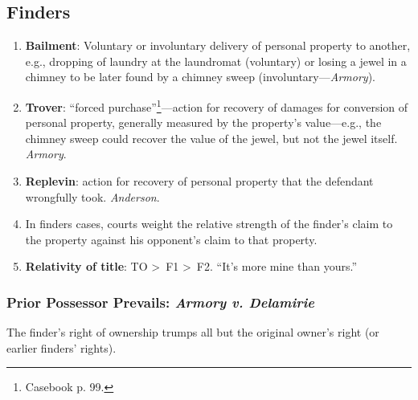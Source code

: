 \subsection{Finders}

\begin{enumerate}
    \item \textbf{Bailment}: Voluntary or involuntary delivery of personal 
    property to another, e.g., dropping of laundry at the laundromat 
    (voluntary) or losing a jewel in a chimney to be later found by a chimney 
    sweep (involuntary---\emph{Armory}).
    \item \textbf{Trover}: ``forced purchase''\footnote{Casebook p. 
    99.}---action for recovery of damages for conversion of personal property, 
    generally measured by the property's value---e.g., the chimney sweep could 
    recover the value of the jewel, but not the jewel itself. \emph{Armory}.
    \item \textbf{Replevin}: action for recovery of personal property that the  
    defendant wrongfully took. \emph{Anderson}.
    \item In finders cases, courts weight the relative strength of the 
    finder's claim to the property against his opponent's claim to that 
    property.
    \item \textbf{Relativity of title}: TO \textgreater\ F1 \textgreater\ F2. 
    ``It's more mine than yours.''
\end{enumerate}

\subsubsection{Prior Possessor Prevails: \emph{Armory v. Delamirie}}

The finder's right of ownership trumps all but the original owner's right (or 
earlier finders' rights).

